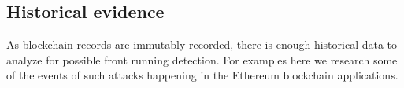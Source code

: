 %
%
%
%
%


\subsection{Historical evidence}
As blockchain records are immutably recorded, there is enough historical data to analyze for possible front running detection. For examples here we research some of the events of such attacks happening in the Ethereum blockchain applications.



